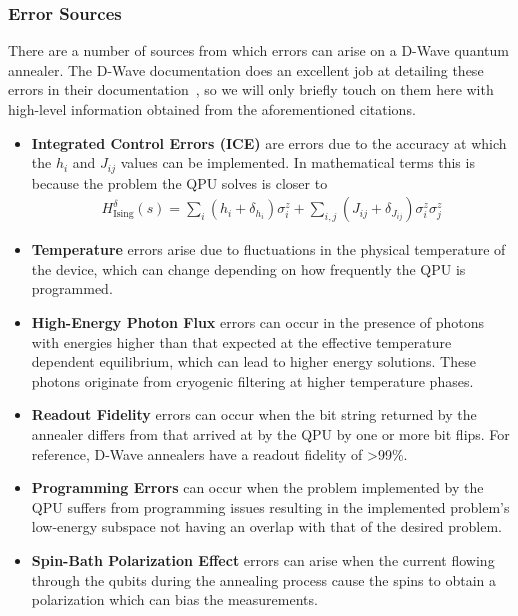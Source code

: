 \subsubsection{Error Sources}
There are a number of sources from which errors can arise on a D-Wave quantum annealer.
The D-Wave documentation does an excellent job at detailing these errors in their documentation~\cite{dwave_ice_errors,dwave_other_errors}, so we will only briefly touch on them here with high-level information obtained from the aforementioned citations.
\begin{itemize}
    \item \textbf{Integrated Control Errors (ICE)} are errors due to the accuracy at which the \( h_i \) and \( J_{ij} \) values can be implemented.
        In mathematical terms this is because the problem the QPU solves is closer to
        \begin{align}
            H_{\text{Ising}}^\delta(s) = \sum_i (h_i + \delta_{h_i}) \sigma_i^z + \sum_{i,j} (J_{ij} + \delta_{J_{ij}}) \sigma_i^z \sigma_j^z
        \end{align}
    \item \textbf{Temperature} errors arise due to fluctuations in the physical temperature of the device, which can change depending on how frequently the QPU is programmed.
    \item \textbf{High-Energy Photon Flux} errors can occur in the presence of photons with energies higher than that expected at the effective temperature dependent equilibrium, which can lead to higher energy solutions. These photons originate from cryogenic filtering at higher temperature phases.
    \item \textbf{Readout Fidelity} errors can occur when the bit string returned by the annealer differs from that arrived at by the QPU by one or more bit flips.
        For reference, D-Wave annealers have a readout fidelity of >99\%.
    \item \textbf{Programming Errors} can occur when the problem implemented by the QPU suffers from programming issues resulting in the implemented problem's low-energy subspace not having an overlap with that of the desired problem.
    \item \textbf{Spin-Bath Polarization Effect} errors can arise when the current flowing through the qubits during the annealing process cause the spins to obtain a polarization which can bias the measurements.
\end{itemize}
